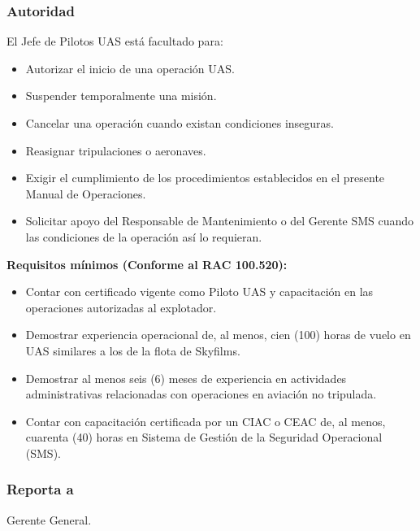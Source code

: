 \subsubsection*{Autoridad}

El Jefe de Pilotos UAS está facultado para:

\begin{itemize}

\item Autorizar el inicio de una operación UAS.

\item Suspender temporalmente una misión.

\item Cancelar una operación cuando existan condiciones inseguras.

\item Reasignar tripulaciones o aeronaves.

\item Exigir el cumplimiento de los procedimientos establecidos en el presente Manual de Operaciones.

\item Solicitar apoyo del Responsable de Mantenimiento o del Gerente SMS cuando las condiciones de la operación así lo requieran.

\end{itemize}


\textbf{Requisitos mínimos (Conforme al RAC 100.520):}
\begin{itemize}
    \item Contar con certificado vigente como Piloto UAS y capacitación en las operaciones autorizadas al explotador.
    \item Demostrar experiencia operacional de, al menos, cien (100) horas de vuelo en UAS similares a los de la flota de Skyfilms.
    \item Demostrar al menos seis (6) meses de experiencia en actividades administrativas relacionadas con operaciones en aviación no tripulada.
    \item Contar con capacitación certificada por un CIAC o CEAC de, al menos, cuarenta (40) horas en Sistema de Gestión de la Seguridad Operacional (SMS).
\end{itemize}

\subsubsection*{Reporta a}

Gerente General.

